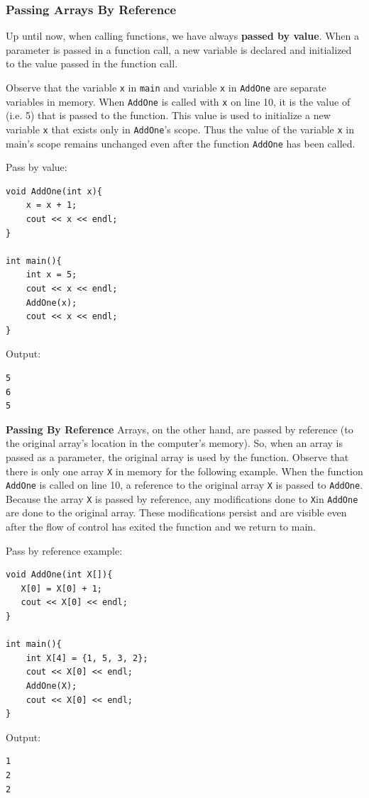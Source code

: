 \subsubsection{Passing Arrays By Reference}
Up until now, when calling functions, we have always \textbf{passed by value}. When a parameter is passed in a function call, a new variable is declared and initialized to the value passed in the function call.

Observe that the variable \texttt{x} in \texttt{main} and variable \texttt{x} in \texttt{AddOne} are separate variables in memory. When \texttt{AddOne} is called with \texttt{x} on line 10, it is the value of \texttt{} (i.e. 5) that is passed to the function. This value is used to initialize a new variable \texttt{x} that exists only in \texttt{AddOne}'s scope. Thus the value of the variable \texttt{x} in main's scope remains unchanged even after the function \texttt{AddOne} has been called.

\begin{example} 
Pass by value:
\begin{verbatim}
void AddOne(int x){
    x = x + 1;
    cout << x << endl;
}

int main(){
    int x = 5;
    cout << x << endl;
    AddOne(x);
    cout << x << endl;
}
\end{verbatim}

Output:

\begin{verbatim}
5
6
5
\end{verbatim}
\end{example}

\textbf{Passing By Reference} Arrays, on the other hand, are passed by reference (to the original array’s location in the computer’s memory). So, when an array is passed as a parameter, the original array is used by the function. Observe that there is only one array \texttt{X} in memory for the following example. When the function \texttt{AddOne} is called on line 10, a reference to the original array \texttt{X} is passed to \texttt{AddOne}. Because the array \texttt{X} is passed by reference, any modifications done to \texttt{X}in \texttt{AddOne} are done to the original array. These modifications persist and are visible even after the flow of control has exited the function and we return to main.

\begin{example}
    Pass by reference example:

    \begin{verbatim}
void AddOne(int X[]){
   X[0] = X[0] + 1;
   cout << X[0] << endl;
}

int main(){
    int X[4] = {1, 5, 3, 2};
    cout << X[0] << endl;
    AddOne(X);
    cout << X[0] << endl;
}
    \end{verbatim}

    Output:

    \begin{verbatim}
1
2
2
    \end{verbatim}
\end{example}

